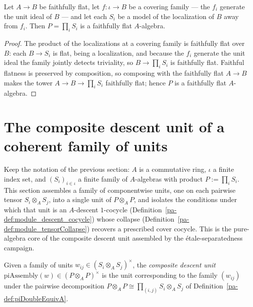 \begin{theorem}
  \label{pa-thm:pi_tower}
  \leanok

  Let \(A \to B\) be faithfully flat, let \(f \colon \iota \to B\) be a covering family — the
  \(f_i\) generate the unit ideal of \(B\) — and let each \(S_i\) be a model of the localization
  of \(B\) away from \(f_i\). Then \(P = \prod_i S_i\) is a faithfully flat \(A\)-algebra.
\end{theorem}
\begin{proof}
  \leanok
  The product of the localizations at a covering family is faithfully flat over \(B\): each
  \(B \to S_i\) is flat, being a localization, and because the \(f_i\) generate the unit ideal
  the family jointly detects triviality, so \(B \to \prod_i S_i\) is faithfully flat. Faithful
  flatness is preserved by composition, so composing with the faithfully flat \(A \to B\) makes
  the tower \(A \to B \to \prod_i S_i\) faithfully flat; hence \(P\) is a faithfully flat
  \(A\)-algebra.
\end{proof}

\section{The composite descent unit of a coherent family of units}
\label{pa-sec:piAssembly}

Keep the notation of the previous section: \(A\) is a commutative ring, \(\iota\) a finite
index set, and \((S_i)_{i \in \iota}\) a finite family of \(A\)-algebras with product
\(P := \prod_i S_i\). This section assembles a family of componentwise units, one on each
pairwise tensor \(S_i \otimes_A S_j\), into a single unit of \(P \otimes_A P\), and isolates
the conditions under which that unit is an \(A\)-descent \(1\)-cocycle
(Definition~\ref{pa-def:module_descent_cocycle}) whose collapse
(Definition~\ref{pa-def:module_tensorCollapse}) recovers a prescribed cover cocycle. This is
the pure-algebra core of the composite descent unit assembled by the \'etale-separatedness
campaign.

\begin{definition}
  \label{pa-def:piAssemblyUnit}
  \leanok

  Given a family of units \(w_{ij} \in (S_i \otimes_A S_j)^{\times}\), the \emph{composite
  descent unit} \(\mathrm{piAssembly}(w) \in (P \otimes_A P)^{\times}\) is the unit
  corresponding to the family \((w_{ij})\) under the pairwise decomposition
  \(P \otimes_A P \cong \prod_{(i,j)} S_i \otimes_A S_j\) of
  Definition~\ref{pa-def:piDoubleEquivA}.
\end{definition}

